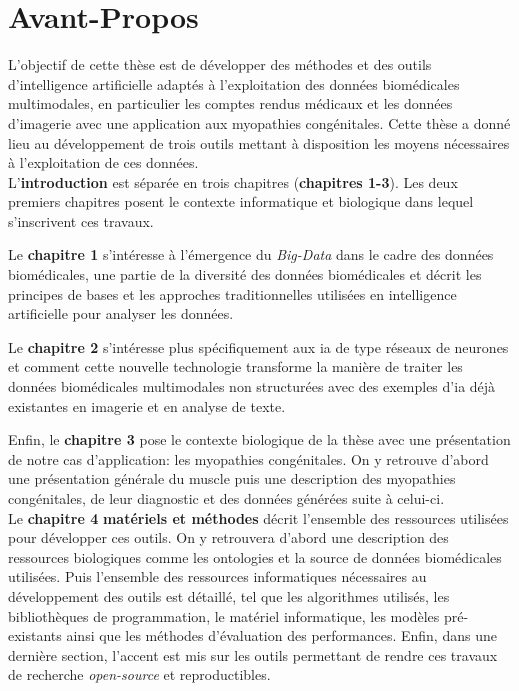 \chapter{Avant-Propos}
L'objectif de cette thèse est de développer des méthodes et des outils d'intelligence artificielle adaptés à l'exploitation des données biomédicales multimodales, en particulier les comptes rendus médicaux et les données d'imagerie avec une application aux myopathies congénitales. Cette thèse a donné lieu au développement de trois outils mettant à disposition les moyens nécessaires à l'exploitation de ces données. \\


L'\textbf{introduction} est séparée en trois chapitres (\textbf{chapitres 1-3}). Les deux premiers chapitres posent le contexte informatique et biologique dans lequel s'inscrivent ces travaux. 

Le \textbf{chapitre 1} s'intéresse à l'émergence du \textit{Big-Data} dans le cadre des données biomédicales, une partie de la diversité des données biomédicales et décrit les principes de bases et les approches traditionnelles utilisées en intelligence artificielle pour analyser les données.

Le \textbf{chapitre 2} s'intéresse plus spécifiquement aux \gls{ia} de type réseaux de neurones et comment cette nouvelle technologie transforme la manière de traiter les données biomédicales multimodales non structurées avec des exemples d'\gls{ia} déjà existantes en imagerie et en analyse de texte.

Enfin, le \textbf{chapitre 3} pose le contexte biologique de la thèse avec une présentation de notre cas d'application: les myopathies congénitales. On y retrouve d'abord une présentation générale du muscle puis une description des myopathies congénitales, de leur diagnostic et des données générées suite à celui-ci. \\


Le \textbf{chapitre 4} \textbf{matériels et méthodes} décrit l'ensemble des ressources utilisées pour développer ces outils. On y retrouvera d'abord une description des ressources biologiques comme les ontologies et la source de données biomédicales utilisées. Puis l'ensemble des ressources informatiques nécessaires au développement des outils est détaillé, tel que les algorithmes utilisés, les bibliothèques de programmation, le matériel informatique, les modèles pré-existants ainsi que les méthodes d'évaluation des performances. Enfin, dans une dernière section, l'accent est mis sur les outils permettant de rendre ces travaux de recherche \textit{open-source} et reproductibles. \\


